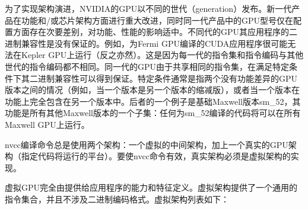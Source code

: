 \documentclass[a4paper,12pt,english]{sphinxmanual}
\begin{document}
\sphinxAtStartPar
为了实现架构演进，NVIDIA的GPU以不同的世代（generation）发布。新一代产品在功能和/或芯片架构方面进行重大改进，同时同一代产品中的GPU型号仅在配置方面存在次要差别，对功能、性能的影响适中。不同代的GPU其应用程序的二进制兼容性是没有保证的。例如，为Fermi GPU编译的CUDA应用程序很可能无法在Kepler GPU上运行（反之亦然）。这是因为每一代的指令集和指令编码与其他世代的指令编码都不相同。同一代的GPU由于共享相同的指令集，在满足特定条件下其二进制兼容性可以得到保证。特定条件通常是指两个没有功能差异的GPU版本之间的情况（例如，当一个版本是另一个版本的缩减版），或者当一个版本在功能上完全包含在另一个版本中。后者的一个例子是基础Maxwell版本sm\_52，其功能是所有其他Maxwell版本的一个子集：任何为sm\_52编译的代码将可以在所有Maxwell GPU上运行。

\sphinxAtStartPar
nvcc编译命令总是使用两个架构：一个虚拟的中间架构，加上一个真实的GPU架构（指定代码将运行的平台）。要使nvcc命令有效，真实架构必须是虚拟架构的实现。

\sphinxAtStartPar
虚拟GPU完全由提供给应用程序的能力和特征定义。虚拟架构提供了一个通用的指令集合，并且不涉及二进制编码格式。虚拟架构列表如下：
\end{document}
